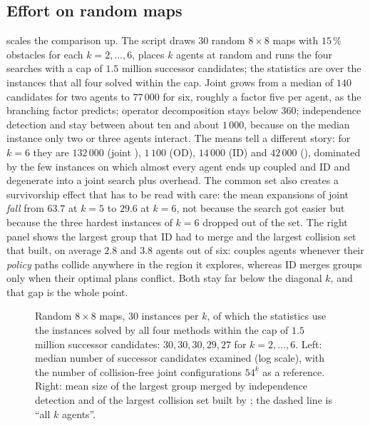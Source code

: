 \subsection{Effort on random maps}
\label{sec:ch11-experiment}

 scales the comparison up. The script
 draws $30$ random $8 \times 8$ maps with
$15\,\%$ obstacles for each $k = 2, \dots, 6$, places $k$ agents at random
and runs the four searches with a cap of $1.5$ million successor candidates;
the statistics are over the instances that all four solved within the cap.
Joint \astar grows from a median of $140$ candidates for two agents to
$77\,000$ for six, roughly a factor five per agent, as the branching factor
predicts; operator decomposition stays below $360$; independence detection
and \mstar stay between about ten and about $1\,000$, because on the median
instance only two or three agents interact. The means tell a different
story: for $k = 6$ they are $132\,000$ (joint \astar), $1\,100$ (OD),
$14\,000$ (ID) and $42\,000$ (\mstar), dominated by the few instances on
which almost every agent ends up coupled and ID and \mstar degenerate into a
joint search plus overhead. The common set also creates a survivorship
effect that has to be read with care: the mean expansions of joint \astar
\emph{fall} from $63.7$ at $k = 5$ to $29.6$ at $k = 6$, not because the
search got easier but because the three hardest instances of $k = 6$ dropped
out of the set. The right panel shows the largest group that ID
had to merge and the largest collision set that \mstar built, on average
$2.8$ and $3.8$ agents out of six: \mstar couples agents whenever their
\emph{policy} paths collide anywhere in the region it explores, whereas ID
merges groups only when their optimal plans conflict. Both stay far below
the diagonal $k$, and that gap is the whole point.

\begin{figure}[!tb]
  \centering
  \caption{Random $8 \times 8$ maps, $30$ instances per $k$, of which the
  statistics use the instances solved by all four methods within the cap of
  $1.5$ million successor candidates: $30, 30, 30, 29, 27$ for $k = 2, \dots, 6$. Left: median
  number of successor candidates examined (log scale), with the number of
  collision-free joint configurations $54^{\underline{k}}$ as a reference.
  Right: mean size of the largest group merged by independence detection
  and of the largest collision set built by \mstar; the dashed line is
  ``all $k$ agents''.}
  \label{fig:ch11-expansions}
\end{figure}
\FloatBarrier

